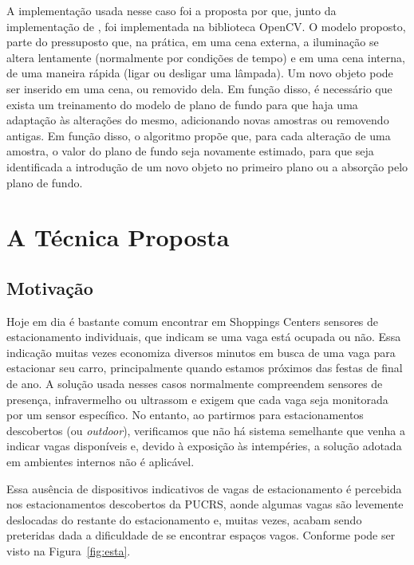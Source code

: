 \documentclass[ecp,tc]{iiufrgs}
\begin{document}
A implementação usada nesse caso foi a proposta por  que, junto da implementação de , foi implementada na biblioteca OpenCV. O modelo proposto, parte do pressuposto que, na prática, em uma cena externa, a iluminação se altera lentamente (normalmente por condições de tempo) e em uma cena interna, de uma maneira rápida (ligar ou desligar uma lâmpada). Um novo objeto pode ser inserido em uma cena, ou removido dela. Em função disso, é necessário que exista um treinamento do modelo de plano de fundo para que haja uma adaptação às alterações do mesmo, adicionando novas amostras ou removendo antigas. Em função disso, o algoritmo propõe que, para cada alteração de uma amostra, o valor do plano de fundo seja novamente estimado, para que seja identificada a introdução de um novo objeto no primeiro plano ou a absorção pelo plano de fundo.


\chapter{A Técnica Proposta}

\section{Motivação}

Hoje em dia é bastante comum encontrar em Shoppings Centers sensores de estacionamento individuais, que indicam se uma vaga está ocupada ou não. Essa indicação muitas vezes economiza diversos minutos em busca de uma vaga para estacionar seu carro, principalmente quando estamos próximos das festas de final de ano. A solução usada nesses casos normalmente compreendem sensores de presença, infravermelho ou ultrassom e exigem que cada vaga seja monitorada por um sensor específico. No entanto, ao partirmos para estacionamentos descobertos (ou \textit{outdoor}), verificamos que não há sistema semelhante que venha a indicar vagas disponíveis e, devido à exposição às intempéries, a solução adotada em ambientes internos não é aplicável.

Essa ausência de dispositivos indicativos de vagas de estacionamento é percebida nos estacionamentos descobertos da PUCRS, aonde algumas vagas são levemente deslocadas do restante do estacionamento e, muitas vezes, acabam sendo preteridas dada a dificuldade de se encontrar espaços vagos. Conforme pode ser visto na Figura~\ref{fig:esta}.
\end{document}

